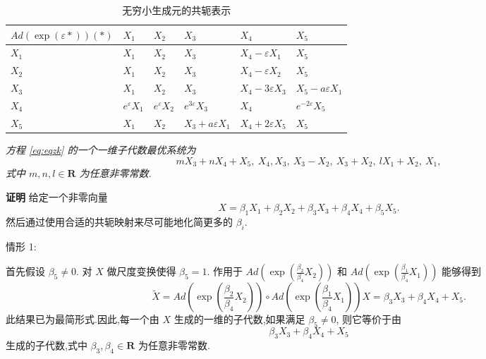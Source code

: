 \begin{table}[!h]
\centering
\caption{{无穷小生成元的共轭表示}}
\label{tab:table1}
\begin{tabularx}{\linewidth}{XXXXXX}
\toprule[1.5pt]
$Ad(\exp(\varepsilon *))(*)$&$X_{1}$&$X_{2}$&$X_{3}$&$X_{4}$&$X_{5}$\\
\midrule[1pt]
$X_{1}$&$X_{1}$&$X_{2}$&$X_{3}$&$X_{4}-\varepsilon X_{1}$&$X_{5}$\\
$X_{2}$&$X_{1}$&$X_{2}$&$X_{3}$&$X_{4}-\varepsilon X_{2}$&$X_{5}$\\
$X_{3}$&$X_{1}$&$X_{2}$&$X_{3}$&$X_{4}-3\varepsilon X_{3}$&$X_{5}-a\varepsilon X_{1}$\\
$X_{4}$&$e^{\varepsilon}X_{1}$&$e^{\varepsilon}X_{2}$&$e^{3\varepsilon}X_{3}$&$X_{4}$&$e^{-2\varepsilon}X_{5}$\\
$X_{5}$&$X_{1}$&$X_{2}$&$X_{3}+a\varepsilon X_{1}$&$X_{4}+2\varepsilon X_{5}$&$X_{5}$\\
\bottomrule[1.5pt]
\end{tabularx}
\end{table}

\begin{theorem}
\emph{方程 \eqref{eq:eqzk} 的一个一维子代数最优系统为
\begin{equation*}
	mX_{3}+nX_{4}+X_{5},~ X_{4}, X_{3},~ X_{3}-X_{2}, ~X_{3}+X_{2}, ~lX_{1}+X_{2}, ~X_{1},
\end{equation*}
式中 $m,n,l\in \mathbf{R}$ 为任意非零常数.}
\end{theorem}

{\textbf{证明}} 给定一个非零向量
\begin{equation*}
	X=\beta_{1}X_{1}+\beta_{2}X_{2}+\beta_{3}X_{3}+\beta_{4}X_{4}+\beta_{5}X_{5}.
\end{equation*}
然后通过使用合适的共轭映射来尽可能地化简更多的 $\beta_i$.

情形 1:

首先假设 $\beta_5\neq 0.$ 对 $X$ 做尺度变换使得 $\beta_5=1$. 作用于 $Ad(\exp{(\frac{\beta_2}{\beta_4} X_2)})$ 和 $Ad(\exp{(\frac{\beta_1}{\beta_4} X_1)})$ 能够得到
\begin{equation*}
	\widetilde{X}=Ad(\exp{(\frac{\beta_2}{\beta_4} X_2)})\circ Ad(\exp{(\frac{\beta_1}{\beta_4} X_1)}) X=\beta_{3}X_{3}+\beta_{4}X_{4}+X_{5}.
\end{equation*}
此结果已为最简形式.因此,每一个由 $X$ 生成的一维的子代数,如果满足 $\beta_5\neq 0 $, 则它等价于由
\begin{equation*}
	\beta_{3}X_{3}+\beta_{4}X_{4}+X_{5}
\end{equation*}
生成的子代数,式中 $\beta_{3}, \beta_{4} \in \mathbf{R}$ 为任意非零常数.

